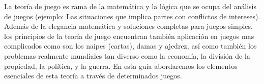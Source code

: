La teoría de juego es rama de la matemática y la lógica que se ocupa del análisis de juegos (ejemplo: Las situaciones que implica partes con conflictos de intereses). Además de la elegancia matemática y soluciones completas para juegos simples, los principios de la teoría de juego encuentran también aplicación en juegos mas complicados como son los naipes (cartas), damas y ajedrez, así como también los problemas realmente mundiales tan diverso como la economía, la división de la propiedad, la política, y la guerra. En esta guía abordaremos los elementos esenciales de esta teoría a través de determinados juegos. 